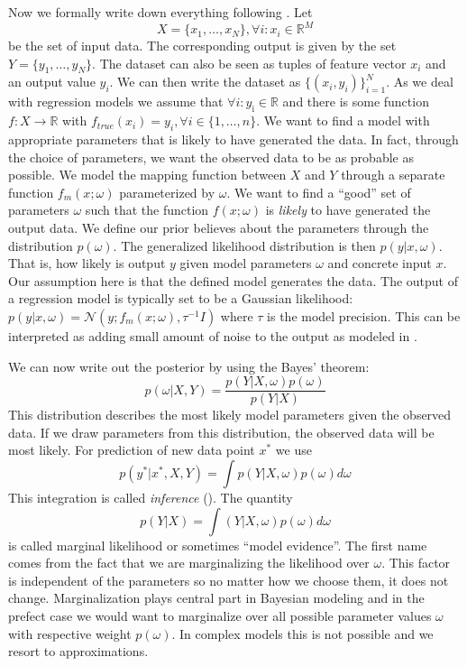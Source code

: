 \documentclass[12pt,a4paper,twoside]{scrartcl}
\numberwithin{equation}{section}
\begin{document}
Now we formally write down everything following \cite{gal2016}. Let
\begin{equation}
  X = \{x_1,\ldots , x_N\}, \forall i : x_i\in\mathbb{R}^M
\end{equation}
be the set of input data. The corresponding output is given by the set \(Y = \{y_1,\ldots , y_N\}\). The dataset can also be seen as tuples of feature vector \(x_i\) and an output value \(y_i\). We can then write the dataset as \(\{ (x_i,y_i)\}_{i=1}^N \). As we deal with regression models we assume that \(\forall i : y_{\text{i}}\in \mathbb{R}\) and there is some function \(f:X \rightarrow\mathbb{R}\) with \(f_{true}(x_i)=y_i, \forall i \in\{1,\ldots , n\}\). We want to find a model with appropriate parameters that is likely to have generated the data. In fact, through the choice of parameters, we want the observed data to be as probable as possible. We model the mapping function between \(X\) and \(Y\) through a separate function \(f_m(x; \omega)\) parameterized by \(\omega\). We want to find a ``good'' set of parameters \(\omega\) such that the function \(f(x;\omega)\) is \emph{likely} to have generated the output data. We define our prior believes about the parameters through the distribution \(p(\omega )\). The generalized likelihood distribution is then \(p(y|x, \omega)\). That is, how likely is output \(y\) given model parameters \(\omega\) and concrete input \(x\). Our assumption here is that the defined model generates the data. The output of a regression model is typically set to be a Gaussian likelihood: \(p(y|x,\omega)=\mathcal{N}(y; f_m(x;\omega), \tau^{-1}I)\) where \(\tau\) is the model precision. This can be interpreted as adding small amount of noise to the output as modeled in \cite{gal2016}.

We can now write out the posterior by using the Bayes' theorem:
\begin{equation}
p(\omega|X,Y) = \frac{p(Y|X, \omega)p(\omega)}{p(Y|X)}
\end{equation}
This distribution describes the most likely model parameters given the observed data. If we draw parameters from this distribution, the observed data will be most likely. For prediction of new data point \(x^*\) we use
\begin{equation}
p(y^{\text{*}}|x^{\text{*}},X,Y) = \displaystyle\int p(Y|X, \omega)p(\omega)d \omega
\end{equation}
This integration is called \emph{inference} (\cite{gal2016}). The quantity
\begin{equation}
 p(Y|X) = \displaystyle\int (Y|X, \omega)p( \omega )d \omega
\end{equation}
is called marginal likelihood or sometimes ``model evidence''. The first name comes from the fact that we are marginalizing the likelihood over \(\omega\). This factor is independent of the parameters so no matter how we choose them, it does not change. Marginalization plays central part in Bayesian modeling and in the prefect case we would want to marginalize over all possible parameter values \(\omega\) with respective weight \(p(\omega)\). In complex models this is not possible and we resort to approximations.
\end{document}
